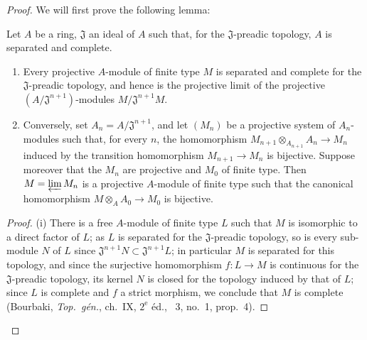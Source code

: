 \begin{proof}
We will first prove the following lemma:

\begin{lemma}[18.3.2.1]
\label{IV.18.3.2.1}
Let $A$ be a ring, $\mathfrak{J}$ an ideal of $A$ such that, for the $\mathfrak{J}$-preadic topology, $A$ is separated and complete.
\begin{enumerate}
  \item[\textup{(i)}] Every projective $A$-module of finite type $M$ is separated and complete for the $\mathfrak{J}$-preadic topology, and hence is the projective limit of the projective $(A/\mathfrak{J}^{n+1})$-modules $M/\mathfrak{J}^{n+1}M$.
  \item[\textup{(ii)}] Conversely, set $A_n=A/\mathfrak{J}^{n+1}$, and let $(M_n)$ be a projective system of $A_n$-modules such that, for every $n$, the homomorphism $M_{n+1}\otimes_{A_{n+1}}A_n\to M_n$ induced by the transition homomorphism $M_{n+1}\to M_n$ is bijective.
Suppose moreover that the $M_n$ are projective and $M_0$ of finite type.
Then $M=\varprojlim M_n$ is a projective $A$-module of finite type such that the canonical homomorphism $M\otimes_A A_0\to M_0$ is bijective.
\end{enumerate}
\end{lemma}

\begin{proof}
(i) There is a free $A$-module of finite type $L$ such that $M$ is isomorphic to a direct factor of $L$;
as $L$ is separated for the $\mathfrak{J}$-preadic topology, so is every sub-module $N$ of $L$ since $\mathfrak{J}^{n+1}N\subset\mathfrak{J}^{n+1}L$;
in particular $M$ is separated for this topology, and since the surjective homomorphism $f:L\to M$ is continuous for the $\mathfrak{J}$-preadic topology, its kernel $N$ is closed for the topology induced by that of $L$;
since $L$ is complete and $f$ a strict morphism, we conclude that $M$ is complete (Bourbaki, \emph{Top.\ g\'en.}, ch.~IX, $2^{\text{e}}$ \'ed., \textsection~3, no.~1, prop.~4).


\end{proof}
\end{proof}
